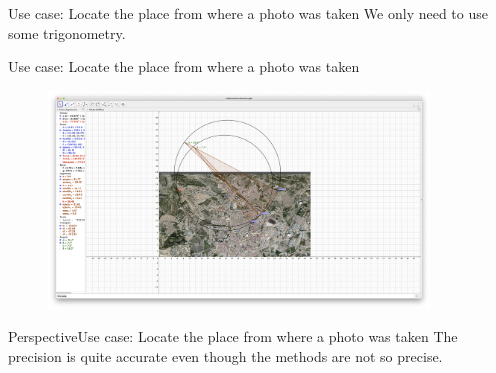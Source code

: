 \begin{frame}{\secname}{Use case: Locate the place from where a photo was taken}
    We only need to use some trigonometry.
    \begin{figure}
    \end{figure}    
\end{frame}

\begin{frame}{\secname}{Use case: Locate the place from where a photo was taken}
    \begin{figure}
        \includegraphics[width=0.9\textwidth]{img/Inter-Circs.png}
    \end{figure}
\end{frame}

\begin{frame}{Perspective}{Use case: Locate the place from where a photo was taken}
    The precision is quite accurate even though the methods are not so precise.
    \begin{figure}
    \end{figure}
\end{frame}

